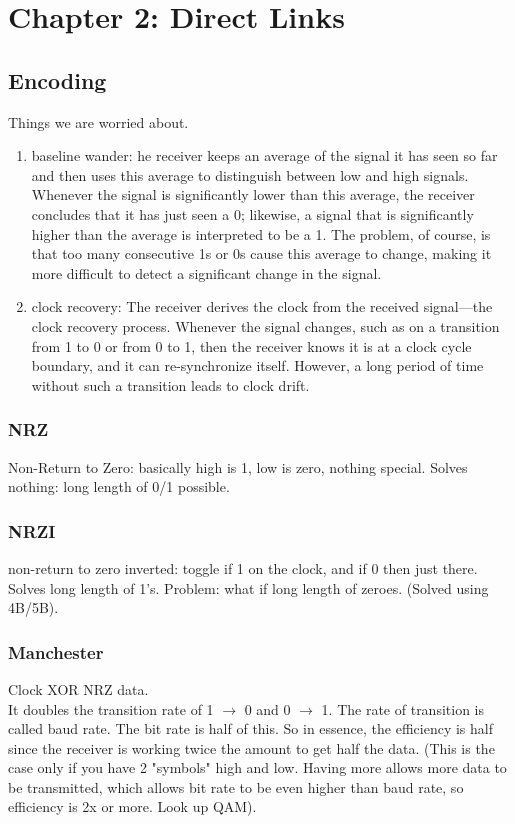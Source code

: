 \documentclass[12pt]{book}
\begin{document}
\chapter{Chapter 2: Direct Links}

\section{Encoding}

Things we are worried about.
\begin{enumerate}
    \item baseline wander: he receiver keeps an average of the signal it has seen so far and then uses this average to distinguish between low and high signals. Whenever the signal is significantly lower than this average, the receiver concludes that it has just seen a 0; likewise, a signal that is significantly higher than the average is interpreted to be a 1. The problem, of course, is that too many consecutive 1s or 0s cause this average to change, making it more difficult to detect a significant change in the signal.
    \item clock recovery: The receiver derives the clock from the received signal—the clock recovery process. Whenever the signal changes, such as on a transition from 1 to 0 or from 0 to 1, then the receiver knows it is at a clock cycle boundary, and it can re-synchronize itself. However, a long period of time without such a transition leads to clock drift.
\end{enumerate}

\subsection{NRZ}
Non-Return to Zero: basically high is 1, low is zero, nothing special. Solves nothing: long length of 0/1 possible.

\subsection{NRZI}
non-return to zero inverted: toggle if 1 on the clock, and if 0 then just there. Solves long length of 1's. Problem: what if long length of zeroes. (Solved using 4B/5B).

\subsection{Manchester}
Clock XOR NRZ data.\\
It doubles the transition rate of 1 $\to$ 0 and 0 $\to$ 1. The rate of transition is called baud rate. The bit rate is half of this. So in essence, the efficiency is half since the receiver is working twice the amount to get half the data. (This is the case only if you have 2 "symbols" high and low. Having more allows more data to be transmitted, which allows bit rate to be even higher than baud rate, so efficiency is 2x or more. Look up QAM).
\end{document}
